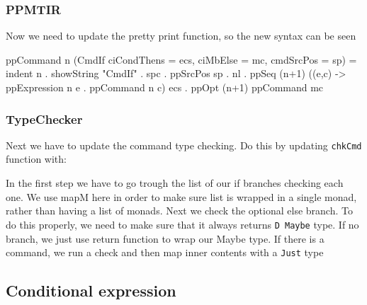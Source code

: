 \documentclass{article}
\begin{document}
\subsubsection{PPMTIR}
\begin{flushleft}
Now we need to update the pretty print function, so the new syntax can be seen
\end{flushleft}
\begin{code}
ppCommand n (CmdIf {ciCondThens = ecs, ciMbElse = mc, cmdSrcPos = sp}) =
    indent n . showString "CmdIf" . spc . ppSrcPos sp . nl
    . ppSeq (n+1) (\n (e,c) -> ppExpression n e . ppCommand n c) ecs
    . ppOpt (n+1) ppCommand mc
\end{code}

\subsubsection{TypeChecker}
\begin{flushleft}
Next we have to update the command type checking. Do this by updating \texttt{chkCmd} function with:
\end{flushleft}
\begin{flushleft}
In the first step we have to go trough the list of our if branches checking each one. We use mapM here in order to make sure list is wrapped in a single monad, rather than having a list of monads. Next we check the optional else branch. To do this properly, we need to make sure that it always returns \texttt{D Maybe} type. If no branch, we just use return function to wrap our Maybe type. If there is a command, we run a check and then map inner contents with a \texttt{Just} type
\end{flushleft}

\subsection{Conditional expression}
\end{document}

